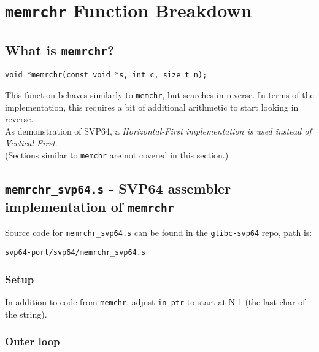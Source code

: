 \section{\texttt{memrchr} Function Breakdown}

\subsection{What is \texttt{memrchr}?}

\begin{verbatim}
void *memrchr(const void *s, int c, size_t n);
\end{verbatim}

This function behaves similarly to \texttt{memchr}, but searches in reverse.
In terms of the implementation, this requires a bit of additional arithmetic
to start looking in reverse.\\

As demonstration of SVP64, a \textit{Horizontal-First implementation is used
instead of Vertical-First}.\\

(Sections similar to \texttt{memchr} are not covered in this section.)

\subsection{\texttt{memrchr\_svp64.s} - SVP64 assembler implementation of \texttt{memrchr}}

Source code for \texttt{memrchr\_svp64.s} can be found in the
\texttt{glibc-svp64} repo, path is:
\begin{verbatim}
svp64-port/svp64/memrchr_svp64.s
\end{verbatim}

\subsubsection{Setup}

In addition to code from \texttt{memchr}, adjust \texttt{in\_ptr}
to start at N-1 (the last char of the string).

\subsubsection{Outer loop}


